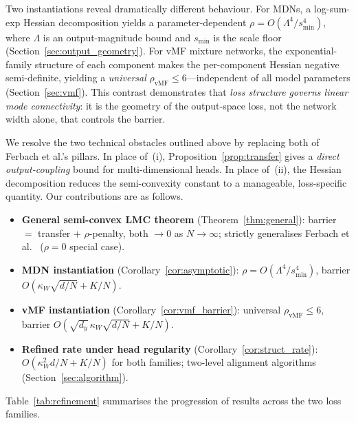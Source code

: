 \documentclass[11pt]{article}
\DeclareMathOperator{\vmf}{vMF}
\begin{document}
Two instantiations reveal dramatically different behaviour.
For MDNs, a log-sum-exp Hessian decomposition yields a
parameter-dependent $\rho = O(\Lambda^4/s_{\min}^4)$, where
$\Lambda$ is an output-magnitude bound and $s_{\min}$ is the scale
floor (Section~\ref{sec:output_geometry}).
For vMF mixture networks, the exponential-family structure of each
component makes the per-component Hessian negative semi-definite,
yielding a \emph{universal} $\rho_{\vmf} \le 6$---independent of all
model parameters (Section~\ref{sec:vmf}).
This contrast demonstrates that \emph{loss structure governs linear
mode connectivity}: it is the geometry of the output-space loss, not
the network width alone, that controls the barrier.

We resolve the two technical obstacles outlined above by replacing
both of Ferbach et al.'s pillars.
In place of~(i), Proposition~\ref{prop:transfer} gives a
\emph{direct output-coupling} bound for multi-dimensional heads.
In place of~(ii), the Hessian decomposition reduces the
semi-convexity constant to a manageable, loss-specific quantity.
Our contributions are as follows.
\begin{itemize}[leftmargin=*,itemsep=2pt]
  \item \textbf{General semi-convex LMC theorem}
    (Theorem~\ref{thm:general}):
    barrier $= $ transfer $+$ $\rho$-penalty, both $\to 0$ as
    $N \to \infty$; strictly generalises Ferbach et
    al.~\cite{ferbach2024} ($\rho = 0$ special case).
  \item \textbf{MDN instantiation}
    (Corollary~\ref{cor:asymptotic}):
    $\rho = O(\Lambda^4/s_{\min}^4)$, barrier
    $O(\kappa_W\sqrt{d/N} + K/N)$.
  \item \textbf{vMF instantiation}
    (Corollary~\ref{cor:vmf_barrier}):
    universal $\rho_{\vmf} \le 6$, barrier
    $O(\sqrt{d_y}\,\kappa_W\sqrt{d/N} + K/N)$.
  \item \textbf{Refined rate under head regularity}
    (Corollary~\ref{cor:struct_rate}):
    $O(\kappa_W^2 d/N + K/N)$ for both families;
    two-level alignment algorithms
    (Section~\ref{sec:algorithm}).
\end{itemize}

\noindent
Table~\ref{tab:refinement} summarises the progression of results across
the two loss families.
\end{document}
